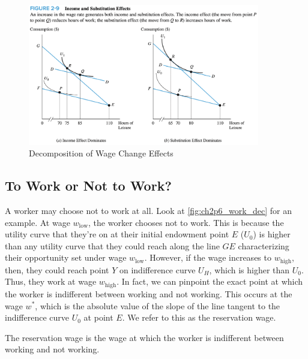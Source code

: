 \FloatBarrier

\begin{figure}[!htb]
    \centering
        \includegraphics[width=0.9\textwidth]{../input/ch_2p5_effect_decomp.png}
    \caption{Decomposition of Wage Change Effects}
    \label{fig:ch2p5_effect_decomp}
\end{figure}

\FloatBarrier

\subsection{To Work or Not to Work?}

A worker may choose not to work at all.
Look at \autoref{fig:ch2p6_work_dec} for an example.
At wage $w_{\text{low}}$, the worker chooses not to work.
This is because the utility curve that they're on
at their initial endowment point $E$ ($U_0$) is higher 
than any utility curve that they could reach along the 
line $GE$ characterizing their opportunity set
under wage $w_{\text{low}}$.
However, if the wage increases to $w_{\text{high}}$,
then, they could reach point $Y$ on indifference curve $U_H$, 
which is higher than $U_0$. Thus, they work at wage $w_{\text{high}}$.
In fact, we can pinpoint the exact point at which 
the worker is indifferent between working and not working.
This occurs at the wage $w^*$, which is the 
absolute value of the slope of the line tangent to
the indifference curve $U_0$ at point $E$.
We refer to this as the reservation wage.

\begin{definition}

    The reservation wage is the wage at which the worker is 
    indifferent between working and not working.
    
\end{definition}

